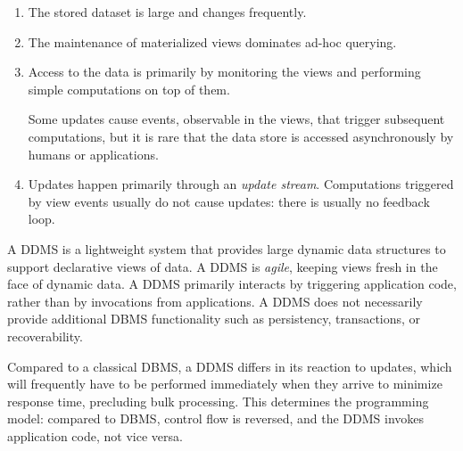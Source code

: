 \begin{enumerate}
\item
The stored dataset is large and changes frequently.

\item 
The
maintenance of materialized views dominates ad-hoc querying.

\item
Access to the data is primarily by monitoring the views and performing
simple computations on top of them.

%
%

Some updates cause events, observable in the views, that trigger subsequent
computations, but it is rare that the data store is accessed asynchronously by
humans or applications.



\item
Updates happen primarily through an {\em update stream}\/. Computations
triggered by view events usually do not cause updates: there is usually no
feedback loop.

\end{enumerate}

\noindent A DDMS is a lightweight system that provides large dynamic data
structures to support declarative views of data. A DDMS is \textit{agile},
keeping views fresh in the face of dynamic data. A DDMS primarily interacts by
triggering application code, rather than by invocations from applications.
A DDMS does not necessarily provide additional DBMS functionality such as
persistency, transactions, or recoverability.




Compared to a classical DBMS, a DDMS differs in its reaction to updates,
which will frequently have to be performed immediately when they arrive to
minimize response time, precluding bulk processing. This determines the
programming model: compared to DBMS, control flow is reversed, and the DDMS
invokes application code, not vice versa. 


